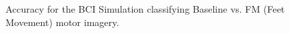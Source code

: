 \documentclass[aspectratio=169]{beamer}
\begin{document}
	
	\begin{frame}
   \begin{figure}[thpb]
      \centering
      \setlength\fboxsep{0pt}
	  \setlength\fboxrule{0.5pt}
      \caption{\centering Accuracy for the BCI Simulation classifying Baseline vs. FM (Feet Movement) motor imagery.}
      \label{figure3}
   \end{figure} 	
	\end{frame}	  
    
\end{document}
